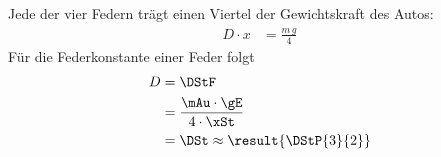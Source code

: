 Jede der vier Federn trägt einen Viertel der Gewichtskraft des Autos:
\begin{align}
 D\cdot x &= \frac{m\,g}{4}
\end{align}
Für die Federkonstante einer Feder folgt
\begin{align}
 D &= \DStF \\
   &= \frac{\mAu\cdot\gE}{4\cdot\xSt} \\
   &= \DSt \approx \result{\DStP{3}{2}}
\end{align}
